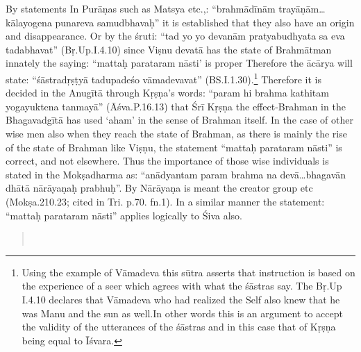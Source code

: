 By statements In Purāṇas such as Matsya etc.,: “brahmādīnām trayāṇām…kālayogena punareva samudbhavaḥ” it is established that they also have an origin and disappearance. Or by the śruti: “tad yo yo devanām pratyabudhyata sa eva tadabhavat” (Bṛ.Up.I.4.10)  since Viṣnu devatā has the state of Brahmātman innately the saying: “mattaḥ parataram nāsti’ is proper Therefore the ācārya will state: “śāstradṛṣṭyā tadupadeśo vāmadevavat” (BS.I.1.30).\footnote{Using the example of Vāmadeva this sūtra asserts that instruction is based on the experience of a seer which agrees with what the śāstras say. The Bṛ.Up I.4.10 declares that Vāmadeva who had realized the Self also knew that he was Manu and the sun as well.In other words this is an argument to accept the validity of the utterances of the śāstras and in this case that of Kṛṣṇa being equal to Īśvara.} Therefore it is decided in the Anugītā through Kṛṣṇa’s words: “param hi brahma kathitam yogayuktena tanmayā” (Āśva.P.16.13) that Śrī Kṛṣṇa the effect-Brahman in the Bhagavadgītā has used ‘aham’ in the sense of Brahman itself. In the case of other wise men also when they reach the state of Brahman, as there is mainly the rise of the state of Brahman like Viṣṇu, the statement “mattaḥ parataram nāsti” is correct, and not elsewhere. Thus the importance of those wise individuals is stated in the Mokṣadharma as: “anādyantam param brahma na devā…bhagavān dhātā nārāyaṇaḥ prabhuḥ”. By Nārāyaṇa is meant the creator group etc (Mokṣa.210.23; cited in Tri. p.70. fn.1). In a similar manner the statement: “mattaḥ parataram nāsti” applies logically to Śiva also.


\begin{verse}
\\
\end{verse}

